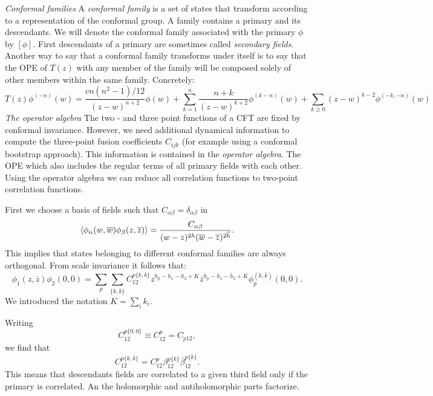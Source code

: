 \documentclass[submission, PhysLectNotes]{SciPost}
\begin{document}
{\it Conformal families}
A \emph{conformal family} is a set of states that transform according to a representation of the conformal group. A family contains a primary and its descendants. We will denote the conformal family associated with the primary $\phi$ by $[\phi]$. First descendants of a primary are sometimes called \emph{secondary fields}. Another way to say that a conformal family transforms under itself is to say that the OPE of $T(z)$ with any member of the family will be composed solely of other members within the same family. Concretely:
\begin{equation}
	T(z)\phi^{(-n)}(w) = \frac{cn(n^2-1)/12}{(z-w)^{n+2}}\phi(w) + \sum_{k=1}^{n}\frac{n+k}{(z-w)^{k+2}}\phi^{(k-n)}(w) + \sum_{k\geq 0}(z-w)^{k-2}\phi^{(-k,-n)}(w)
\end{equation}
{\it The operator algebra}
The two - and three point functions of a CFT are fixed by conformal invariance. However, we need additional dynamical information to compute the three-point fusion coefficients $C_{ijk}$ (for example using a conformal bootstrap approach). This information is contained in the \emph{operator algebra}. The OPE which also includes the regular terms of all primary fields with each other. Using the operator algebra we can reduce all correlation functions to two-point correlation functions.

First we choose a basis of fields such that $C_{\alpha\beta} = \delta_{\alpha\beta}$ in
\begin{equation}
	\expval{\phi_\alpha(w,\overline{w})\phi_\beta(z,\overline{z})} = \frac{C_{\alpha\beta}}{(w-z)^{2h}(\overline{w}-\overline{z})^{2\overline{h}}}.
\end{equation}
This implies that states belonging to different conformal families are always orthogonal.
From scale invariance it follows that:
\begin{equation}
	\phi_1(z,\overline{z})\phi_2(0,0) = \sum_p \sum_{\{k,\overline{k}\}} C_{12}^{p\{k,\overline{k}\}}z^{h_p-h_1 -h_2+K} \overline{z}^{\overline{h}_p-\overline{h}_1-\overline{h}_2+\overline{K}}\phi_p^{(k,\overline{k})}(0,0).
\end{equation}
We introduced the notation $K = \sum_i k_i$.

Writing
\begin{equation}
	C_{12}^{p\{0,0\}} \equiv C^p_{12} = C_{p12},
\end{equation}
we find that
\begin{equation}
	C_{12}^{p\{k,\overline{k}\}} = C_{12}^p \beta_{12}^{p\{k\}} \overline{\beta}_{12}^{p\{\overline{k}\}}.
\end{equation}
This means that descendants fields are correlated to a given third field only if the primary is correlated. An the holomorphic and antiholomorphic parts factorize.
\end{document}

